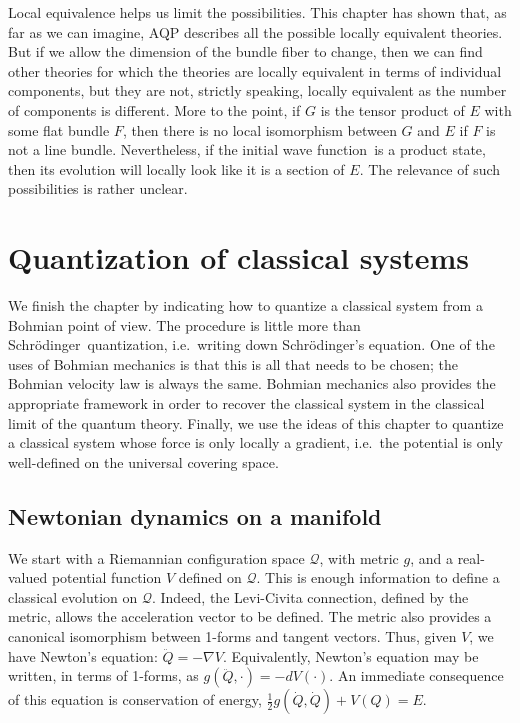 \documentclass[11pt]{article}
\theoremstyle{remark}
\begin{document}
Local equivalence helps us limit the possibilities. This chapter has
shown that, as far as we can imagine, AQP describes all the possible
locally equivalent theories. But if we allow  the dimension of the
bundle fiber to change, then we can find other theories for which 
the theories are locally equivalent in terms of individual 
components, but they are not,
strictly speaking, 
locally equivalent as the number of components is different. 
More to the point, if $G$ is the  tensor product of  $E$ with some flat bundle
$F$, then there is no local isomorphism between $G$ and $E$ if $F$ is
not a line bundle. Nevertheless, if the initial wave function\ is a product
state, then its evolution will locally look like it is a section of
$E$. The relevance of such possibilities is rather unclear. 


\section{Quantization of classical systems} \label{is:quant}

We finish the chapter by indicating how to quantize a classical system
from a Bohmian point of view. The procedure is little more than Schr\"odinger\
quantization, i.e.\ writing down  Schr\"odinger's equation. One of the uses of Bohmian
mechanics is that this is all that needs to be chosen; the Bohmian
velocity law is always the same. Bohmian mechanics also provides the
appropriate framework in order to recover the classical system in the
classical limit of the quantum theory. Finally, we use the ideas of
this chapter to quantize a classical system whose force is only locally
a gradient, i.e.\ the potential is only well-defined on the universal
covering space.  

\subsection{Newtonian dynamics on a manifold}
We start with a Riemannian configuration space \ensuremath{\mathcal{Q}}, 
with metric $g$, and a
real-valued potential function $V$ defined on \ensuremath{\mathcal{Q}}.
This is
enough information to define a classical evolution on 
\ensuremath{\mathcal{Q}}. Indeed, the Levi-Civita connection, defined by the metric,
allows the acceleration vector to be defined. The metric also provides
a canonical isomorphism between 
 1-forms and tangent vectors. Thus, given $V$, we have
Newton's equation: $\ddot{Q} = - \nabla V$. Equivalently, Newton's 
 equation may be written, in terms of 1-forms, as 
$g(\ddot{Q}, \cdot) = -dV(\cdot)$. An immediate
consequence of this equation is conservation of energy, 
$ \frac{1}{2}g(\dot{Q},\dot{Q}) + V(Q) = E$. 
\end{document}
